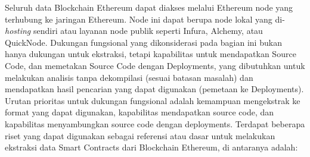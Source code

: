 Seluruh data Blockchain Ethereum dapat diakses melalui Ethereum node yang terhubung ke jaringan Ethereum. Node ini dapat berupa node lokal yang di-\textit{hosting} sendiri atau layanan node publik seperti Infura, Alchemy, atau QuickNode. Dukungan fungsional yang dikonsiderasi pada bagian ini bukan hanya dukungan untuk ekstraksi, tetapi kapabilitas untuk mendapatkan Source Code, dan memetakan Source Code dengan Deployments, yang dibutuhkan untuk melakukan analisis tanpa dekompilasi (sesuai batasan masalah) dan mendapatkan hasil pencarian yang dapat digunakan (pemetaan ke Deployments). Urutan prioritas untuk dukungan fungsional adalah kemampuan mengekstrak ke format yang dapat digunakan, kapabilitas mendapatkan source code, dan kapabilitas menyambungkan source code dengan deployments. Terdapat beberapa riset yang dapat digunakan sebagai referensi atau dasar untuk melakukan ekstraksi data Smart Contracts dari Blockchain Ethereum, di antaranya adalah:

